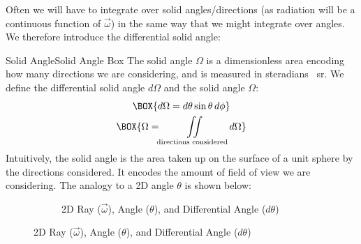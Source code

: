 Often we will have to integrate over solid angles/directions (as radiation will be a continuous function of $\vec{\omega}$) in the same way that we might integrate over angles. We therefore introduce the differential solid angle:

\begin{fact}{Solid Angle}{Solid Angle Box}\label{Solid Angle Box}
    The solid angle $\Omega$ is a dimensionless area encoding how many directions we are considering, and is measured in steradians \qty{}{\steradian}. We define the differential solid angle $d\Omega$ and the solid angle $\Omega$:
    \begin{gather}
        \BOX{d\Omega=d\theta \sin\theta \,d\phi}\\
        \BOX{\Omega = \iint\displaylimits_\text{directions considered} d\Omega}
    \end{gather}
    Intuitively, the solid angle is the area taken up on the surface of a unit sphere by the directions considered. It encodes the amount of field of view we are considering. The analogy to a 2D angle $\theta$ is shown below:
    \begin{figure}[H]
        \centering
        \begin{subfigure}{0.4\linewidth}
            \centering
            \caption{2D Ray ($\vec{\omega}$), Angle ($\theta$), and Differential Angle ($d\theta$)}
            \label{2D Ray}

\end{subfigure}
\end{figure}
\end{fact}
